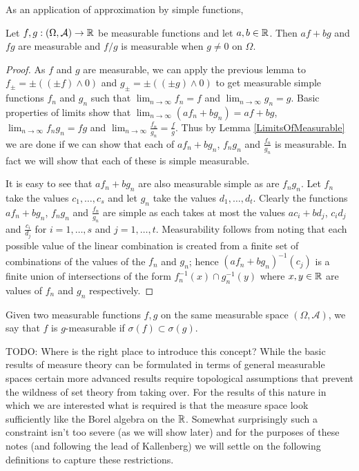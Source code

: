 As an application of approximation by simple functions, 
\begin{lem}\label{ArithmeticCombinationsOfMeasurableFunctions}
Let $f,g : (\Omega, \mathcal{A}) \to \mathbb{R}$ be measurable functions
and let $a,b \in \mathbb{R}$.  Then $af + bg$ and $fg$ are measurable and
$f/g$ is measurable when $g \neq 0$ on $\Omega$.
\end{lem}
\begin{proof}As $f$ and $g$ are measurable, we can apply the previous
  lemma to $f_\pm = \pm((\pm f) \wedge 0)$ and $g_{\pm} = \pm((\pm g) \wedge 0)$
  to get measurable simple functions $f_n$ and $g_n$ such that $\lim_{n \to
    \infty} f_n = f$ and $\lim_{n \to
    \infty} g_n = g$.  Basic properties of limits show that $\lim_{n
    \to \infty} (a f_n + b g_n) = a f + b g$, $\lim_{n \to \infty} f_n
  g_n = f g$ and $\lim_{n \to \infty} \frac{f_n}{  g_n} =
  \frac{f}{g}$.  Thus by Lemma \ref{LimitsOfMeasurable} we are done if
  we can show that each of $a f_n + b g_n$, $f_n g_n$ and
  $\frac{f_n}{g_n}$ is measurable.  In fact we will show that each of
  these is simple measurable.

It is easy to see that $a f_n + b g_n$ are also
  measurable simple as are $f_n g_n$.  Let $f_n$ take the values $c_1,
  \dots, c_s$ and let $g_n$ take the values $d_1, \dots, d_t$.  
Clearly the functions  $a f_n + b g_n$, $f_n g_n$ and
  $\frac{f_n}{g_n}$ are simple as each takes at most the values  $a c_i + b d_j$, $c_i d_j$ and
  $\frac{c_i}{d_j}$ for $i=1,\dots,s$ and $j=1,\dots, t$.  
Measurability follows from noting that each
  possible value of the linear combination is created from a finite
  set of combinations of the values of the $f_n$ and $g_n$; hence
  $(af_n + bg_n)^{-1}(c_j)$ is a finite union of intersections of the
  form $f_n^{-1}(x) \cap g_n^{-1}(y)$ where $x,y \in \mathbb{R}$ are
  values of $f_n$ and $g_n$ respectively.
\end{proof}

\begin{defn}Given two measurable functions $f,g$ on the same measurable space
  $(\Omega, \mathcal{A})$, we say that $f$ is $g$-measurable if
  $\sigma(f) \subset \sigma(g)$.
\end{defn}

TODO: Where is the right place to introduce this concept?
While the basic results of measure theory can be formulated in terms
of general measurable spaces certain more advanced results require
topological assumptions that prevent the wildness of set theory from
taking over.  For the results of this nature in which we are
interested what is required is that the measure space look
sufficiently like the Borel algebra on the $\mathbb{R}$.  Somewhat
surprisingly such a constraint isn't too severe (as we will show
later) and for the purposes of these notes (and following the lead
of Kallenberg) we will settle on the following definitions to capture
these restrictions.


